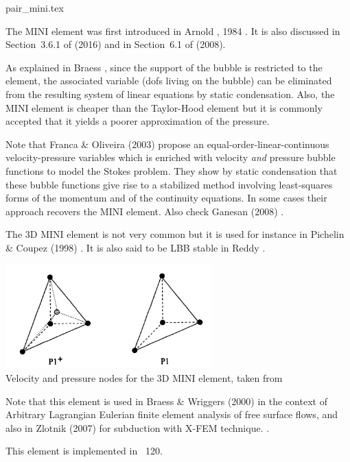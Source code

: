 \begin{flushright} {\tiny {\color{gray} pair\_mini.tex}} \end{flushright}

\noindent
\begin{minipage}{0.48\textwidth}
The  MINI element was first introduced in Arnold \etal, 1984 \cite{arbf84}.
It is also discussed in Section~3.6.1 of \textcite{john16} (2016) and in Section~6.1 
of \textcite{bobf08} (2008).

As explained in Braess \cite{braess}, since the support of the bubble is restricted to the element, 
the associated variable (dofs living on the bubble) can be eliminated from the resulting 
system of linear equations by static condensation. 
Also, the MINI element is cheaper than the Taylor-Hood element but it is commonly accepted
that it yields a poorer approximation of the pressure.
\end{minipage}\hfill
\begin{minipage}{0.48\textwidth}

\end{minipage}

\begin{remark}
Note that Franca \& Oliveira (2003) \cite{frol03} propose an equal-order-linear-continuous 
velocity-pressure variables which is enriched 
with velocity {\it and} pressure bubble functions to model the Stokes problem. 
They show by static condensation that
these bubble functions give rise to a stabilized method involving least-squares forms of 
the momentum and of the
continuity equations. In some cases their approach recovers 
the MINI element. Also check Ganesan \etal (2008) \cite{gamt08}.
\end{remark}


The 3D MINI element is not very common but it is used for instance in Pichelin \& Coupez (1998) 
\cite{pico98}. It is also said to be LBB stable in Reddy \cite[p180]{reddybook2}.

\begin{center}
\includegraphics[width=8cm]{images/mini/mini3D}\\
{\captionfont Velocity and pressure nodes for the 3D MINI element, taken from \cite{pico98}}
\end{center}

Note that this element is used in Braess \& Wriggers (2000) \cite{brwr00} 
in the context of Arbitrary Lagrangian Eulerian 
finite element analysis of free surface flows, and also 
in Zlotnik \etal (2007) \cite{zldf07} for subduction with X-FEM technique. 
.

This element is implemented in \stone~120.
